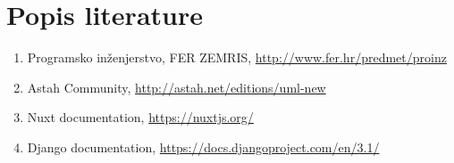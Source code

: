 \chapter*{Popis literature}
	 	
		\begin{comment}
		\textit{Popisati sve reference i literaturu koja je pomogla pri ostvarivanju projekta.}
		\end{comment}
		
		
		\begin{enumerate}
			
			
			\item  Programsko inženjerstvo, FER ZEMRIS, \url{http://www.fer.hr/predmet/proinz}
			
			\item  Astah Community, \url{http://astah.net/editions/uml-new}
			
			\item  Nuxt documentation, \url{https://nuxtjs.org/}
			
			\item  Django documentation, \url{https://docs.djangoproject.com/en/3.1/}
		\end{enumerate}
		
		 
